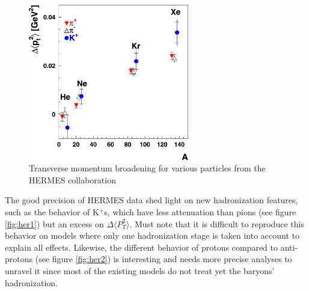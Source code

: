 \begin{figure}[htbp]
\centering
\includegraphics[width=7cm] {fig/Hermes/pthermes.png} 
\caption {Transverse momentum broadening for various particles from the HERMES collaboration \cite{Airapetian:2009jy}}
\label{fig:her3}
\end{figure}

The good precision of HERMES data shed light on new hadronization features, such as the behavior of K$^+$s, which have less attenuation than pions (see figure \ref{fig:her1}) but an excess on $\Delta \langle P_T^2 \rangle$. Must note that it is difficult to reproduce this behavior on models where only one hadronization stage is taken into account to explain all effects. Likewise, the different behavior of protons compared to anti-protons (see figure \ref{fig:her2}) is interesting and needs more precise analyses to unravel it since most of the existing models do not treat yet the baryons' hadronization.

